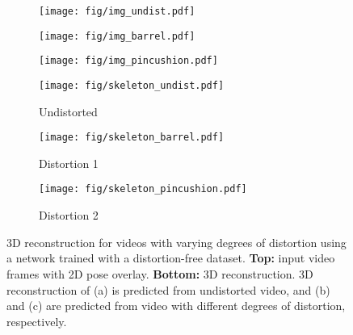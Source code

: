     \begin{figure}[t]
    	\begin{center}
    		\captionsetup{justification=centering}
    		\begin{subfigure}[t]{0.325\linewidth}
    			\centering
    			\texttt{[image: fig/img\_undist.pdf]}
    		\end{subfigure}
    		\begin{subfigure}[t]{0.325\linewidth}
    			\centering
    			\texttt{[image: fig/img\_barrel.pdf]}
    		\end{subfigure}
    		\begin{subfigure}[t]{0.325\linewidth}
    			\centering
    			\texttt{[image: fig/img\_pincushion.pdf]}
    		\end{subfigure}
    		
    		\begin{subfigure}[t]{0.325\linewidth}
    			\centering
    			\texttt{[image: fig/skeleton\_undist.pdf]}
    			\caption{Undistorted}
    		\end{subfigure}
    		\begin{subfigure}[t]{0.325\linewidth}
    			\centering
    			\texttt{[image: fig/skeleton\_barrel.pdf]}
    			\caption{Distortion 1}
    		\end{subfigure}
    		\begin{subfigure}[t]{0.325\linewidth}
    			\centering
    			\texttt{[image: fig/skeleton\_pincushion.pdf]}
    			\caption{Distortion 2}
    		\end{subfigure}
    	\end{center}
    	    \vspace{-3mm}
    		\caption{3D reconstruction for videos with varying degrees of distortion using a network trained with a distortion-free dataset. \textbf{Top:} input video frames with 2D pose overlay. \textbf{Bottom:} 3D reconstruction. 3D reconstruction of (a) is predicted from undistorted video, and (b) and (c) are predicted from video with different degrees of distortion, respectively.}
    	\label{fig:performance_drop}
    	\vspace{-1mm}
    \end{figure}
    
